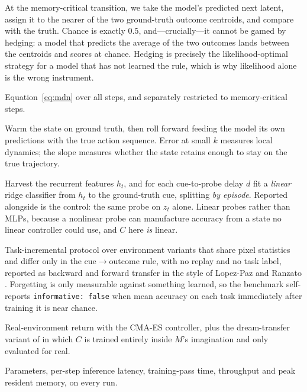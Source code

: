 \documentclass[11pt,a4paper]{article}
\newcommand{\code}[1]{\texttt{\small #1}}
\begin{document}
\begin{description}[leftmargin=*,style=nextline]
\item[Decision accuracy (headline).] At the memory-critical transition, we take
the model's predicted next latent, assign it to the nearer of the two
ground-truth outcome centroids, and compare with the truth. Chance is exactly
$0.5$, and---crucially---it cannot be gamed by hedging: a model that predicts the
average of the two outcomes lands between the centroids and scores at chance.
Hedging is precisely the likelihood-optimal strategy for a model that has not
learned the rule, which is why likelihood alone is the wrong instrument.

\item[Teacher-forced NLL.] Equation~\ref{eq:mdn} over all steps, and separately
restricted to memory-critical steps.

\item[Open-loop imagination.] Warm the state on ground truth, then roll forward
feeding the model its own predictions with the true action sequence. Error at
small $k$ measures local dynamics; the slope measures whether the state retains
enough to stay on the true trajectory.

\item[Retention probes.] Harvest the recurrent features $h_t$, and for each
cue-to-probe delay $d$ fit a \emph{linear} ridge classifier from $h_t$ to the
ground-truth cue, splitting \emph{by episode}. Reported alongside is the control:
the same probe on $z_t$ alone. Linear probes rather than MLPs, because a
nonlinear probe can manufacture accuracy from a state no linear controller could
use, and $C$ here \emph{is} linear.

\item[Continual learning.] Task-incremental protocol over environment variants
that share pixel statistics and differ only in the cue$\rightarrow$outcome rule,
with no replay and no task label, reported as backward and forward transfer in
the style of Lopez-Paz and Ranzato \cite{lopezpaz2017gem}. Forgetting is only
measurable against something learned, so the benchmark self-reports
\code{informative: false} when mean accuracy on each task immediately after
training it is near chance.

\item[Control.] Real-environment return with the CMA-ES controller, plus the
dream-transfer variant of \cite[\S5]{ha2018world} in which $C$ is trained
entirely inside $M$'s imagination and only evaluated for real.

\item[Cost.] Parameters, per-step inference latency, training-pass time,
throughput and peak resident memory, on every run.
\end{description}
\end{document}

